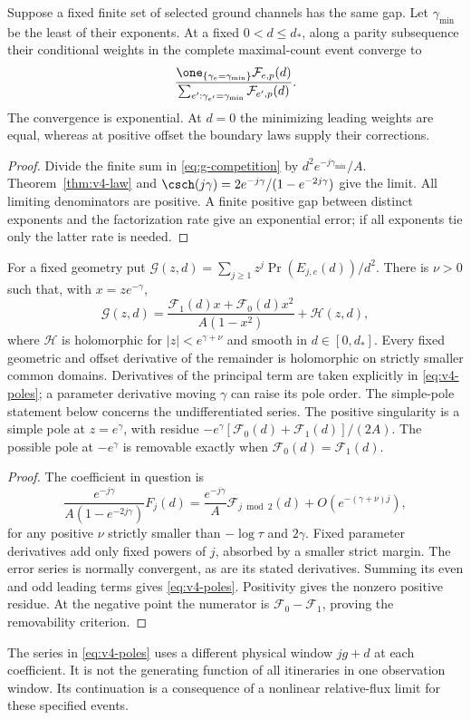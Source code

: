 \begin{corollary}\label{cor:v4-weights}
Suppose a fixed finite set of selected ground channels has the same
gap. Let $\gamma_{\min}$ be the least of their exponents. At a fixed
$0<d\le d_*$, along a parity subsequence their conditional weights in
the complete maximal-count event converge to
\[
 \frac{\one_{\{\gamma_e=\gamma_{\min}\}}\mathcal F_{e,p}(d)}
 {\sum_{e':\gamma_{e'}=\gamma_{\min}}\mathcal F_{e',p}(d)}.
\]
The convergence is exponential. At $d=0$ the minimizing leading
weights are equal, whereas at positive offset the boundary laws
supply their corrections.
\end{corollary}
\begin{proof}
Divide the finite sum in \eqref{eq:g-competition} by
$d^2e^{-j\gamma_{\min}}/A$. Theorem~\ref{thm:v4-law} and
$\csch(j\gamma)=2e^{-j\gamma}/(1-e^{-2j\gamma})$ give the limit.
All limiting denominators are positive. A finite positive gap between
distinct exponents and the factorization rate give an exponential
error; if all exponents tie only the latter rate is needed.
\end{proof}

\begin{corollary}\label{cor:v4-poles}
For a fixed geometry put
$\mathcal G(z,d)=\sum_{j\ge1}z^j\Pr(E_{j,e}(d))/d^2$.
There is $\nu>0$ such that, with $x=ze^{-\gamma}$,
\begin{equation}\label{eq:v4-poles}
 \mathcal G(z,d)=
 \frac{\mathcal F_1(d)x+\mathcal F_0(d)x^2}{A(1-x^2)}
                      +\mathcal H(z,d),
\end{equation}
where $\mathcal H$ is holomorphic for $|z|<e^{\gamma+\nu}$ and
smooth in $d\in[0,d_*]$. Every fixed geometric and offset derivative of the remainder is
holomorphic on strictly smaller common domains. Derivatives of the
principal term are taken explicitly in \eqref{eq:v4-poles}; a parameter
derivative moving $\gamma$ can raise its pole order. The simple-pole
statement below concerns the undifferentiated series.
The positive singularity is a simple pole at $z=e^\gamma$, with
residue $-e^\gamma[\mathcal F_0(d)+\mathcal F_1(d)]/(2A)$.
The possible pole at $-e^\gamma$ is removable exactly when
$\mathcal F_0(d)=\mathcal F_1(d)$.
\end{corollary}
\begin{proof}
The coefficient in question is
\[
 \frac{e^{-j\gamma}}{A(1-e^{-2j\gamma})}F_j(d)
 =\frac{e^{-j\gamma}}A\mathcal F_{j\bmod2}(d)
                       +O(e^{-(\gamma+\nu)j}),
\]
for any positive $\nu$ strictly smaller than $-\log\tau$ and
$2\gamma$. Fixed parameter derivatives add only fixed powers of $j$,
absorbed by a smaller strict margin. The error series is normally
convergent, as are its stated derivatives. Summing its even and odd
leading terms gives \eqref{eq:v4-poles}. Positivity gives the nonzero
positive residue. At the negative point the numerator is
$\mathcal F_0-\mathcal F_1$, proving the removability criterion.
\end{proof}

The series in \eqref{eq:v4-poles} uses a different physical window
$jg+d$ at each coefficient. It is not the generating function of all
itineraries in one observation window. Its continuation is a consequence
of a nonlinear relative-flux limit for these specified events.
